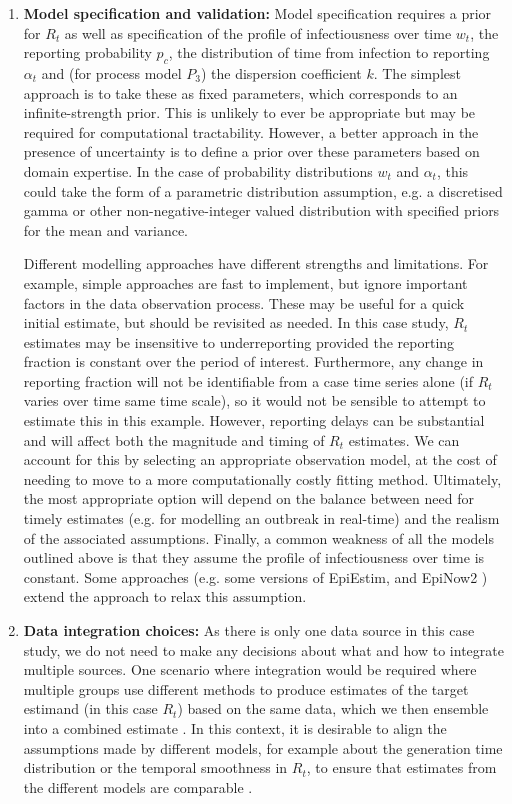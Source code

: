 \documentclass{article}
\begin{document}
\begin{enumerate}
\item \textbf{Model specification and validation:} Model specification requires a prior for $R_t$ as well as specification of the profile of infectiousness over time $w_t$, the reporting probability $p_c$, the distribution of time from infection to reporting $\alpha_t$ and (for process model $P_3$) the dispersion coefficient $k$. The simplest approach is to take these as fixed parameters, which corresponds to an infinite-strength prior. This is unlikely to ever be appropriate but may be required for computational tractability. However, a better approach in the presence of uncertainty is to define a prior over these parameters based on domain expertise. In the case of probability distributions $w_t$ and $\alpha_t$, this could take the form of a parametric distribution assumption, e.g. a discretised gamma \citep{charniga2024best,park2024estimating} or other non-negative-integer valued distribution with specified priors for the mean and variance. 

Different modelling approaches have different strengths and limitations. For example, simple approaches are fast to implement, but ignore important factors in the data observation process. These may be useful for a quick initial estimate, but should be revisited as needed. In this case study, $R_t$ estimates may be insensitive to underreporting provided the reporting fraction is constant over the period of interest. Furthermore, any change in reporting fraction will not be identifiable from a case time series alone (if $R_t$ varies over time same time scale), so it would not be sensible to attempt to estimate this in this example. However, reporting delays can be substantial and will affect both the magnitude and timing of $R_t$ estimates. We can account for this by selecting an appropriate observation model, at the cost of needing to move to a more computationally costly fitting method. Ultimately, the most appropriate option will depend on the balance between need for timely estimates (e.g. for modelling an outbreak in real-time) and the realism of the associated assumptions. 
Finally, a common weakness of all the models outlined above is that they assume the profile of infectiousness over time is constant. Some approaches (e.g. some versions of EpiEstim, and EpiNow2 \citep{abbott2020estimating}) extend the approach to relax this assumption.
 
\item \textbf{Data integration choices:} As there is only one data source in this case study, we do not need to make any decisions about what and how to integrate multiple sources. One scenario where integration would be required where multiple groups use different methods to produce estimates of the target estimand (in this case $R_t$) based on the same data, which we then ensemble into a combined estimate \citep{maishman2022statistical,manley2024combining}. In this context, it is desirable to align the assumptions made by different models, for example about the generation time distribution or the temporal smoothness in $R_t$, to ensure that estimates from the different models are  comparable \citep{brockhaus2023why}.

 \end{enumerate}
\end{document}
